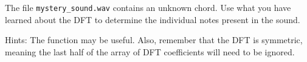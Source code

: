 \begin{problem}
The file \texttt{mystery\_sound.wav} contains an unknown chord.
Use what you have learned about the DFT to determine the individual notes present in the sound.

Hints: The function  may be useful. Also, remember that the DFT is symmetric, meaning the last half of the array of DFT coefficients will need to be ignored.
\end{problem} 

